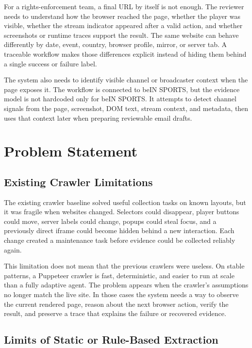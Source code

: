 For a rights-enforcement team, a final URL by itself is not enough. The
reviewer needs to understand how the browser reached the page, whether the
player was visible, whether the stream indicator appeared after a valid action,
and whether screenshots or runtime traces support the result. The same website
can behave differently by date, event, country, browser profile, mirror, or
server tab. A traceable workflow makes those differences explicit instead of
hiding them behind a single success or failure label.

The system also needs to identify visible channel or broadcaster context when
the page exposes it. The workflow is connected to beIN SPORTS, but the evidence
model is not hardcoded only for beIN SPORTS. It attempts to detect channel
signals from the page, screenshot, DOM text, stream context, and metadata, then
uses that context later when preparing reviewable email drafts.

\section{Problem Statement}

\subsection{Existing Crawler Limitations}

The existing crawler baseline solved useful collection tasks on known layouts,
but it was fragile when websites changed. Selectors could disappear, player
buttons could move, server labels could change, popups could steal focus, and a
previously direct iframe could become hidden behind a new interaction. Each
change created a maintenance task before evidence could be collected reliably
again.

This limitation does not mean that the previous crawlers were useless. On
stable patterns, a Puppeteer crawler is fast, deterministic, and easier to run
at scale than a fully adaptive agent. The problem appears when the crawler's
assumptions no longer match the live site. In those cases the system needs a
way to observe the current rendered page, reason about the next browser action,
verify the result, and preserve a trace that explains the failure or recovered
evidence.

\subsection{Limits of Static or Rule-Based Extraction}

